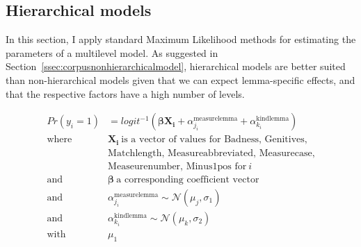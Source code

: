 \documentclass[USenglish]{article}
\begin{document}
\subsection{Hierarchical models}
\label{ssec:corpushierarchicalmodel}

In this section, I apply standard Maximum Likelihood methods for estimating the parameters of a multilevel model.
As suggested in Section~\ref{ssec:corpusnonhierarchicalmodel}, hierarchical models are better suited than non-hierarchical models given that we can expect lemma-specific effects, and that the respective factors have a high number of levels.



\begin{equation}
  \begin{split}
    Pr(y_i=1)       & = logit^{-1}(\pmb{\beta}\mathbf{X_i} + \alpha^{\text{measurelemma}}_{j_i} + \alpha^{\text{kindlemma}}_{k_i}) \\
    \text{where}\ \ & \mathbf{X_i}\ \text{is a vector of values for Badness, Genitives, } \\
                    & \text{Matchlength, Measureabbreviated, Measurecase,} \\
                    & \text{Measeurenumber, Minus1pos for}\ i \\
    \text{and}\ \   & \pmb{\beta}\ \text{a corresponding coefficient vector} \\
    \text{and}\ \   & \alpha^{\text{measurelemma}}_{j_i}\sim\mathcal{N}(\mu_j,\sigma_1) \\
    \text{and}\ \   & \alpha^{\text{kindlemma}}_{k_i}\sim\mathcal{N}(\mu_k,\sigma_2) \\
    \text{with}\ \  & \mu_1 \\
  \end{split}
  \label{eq:model:mnglmm}
\end{equation}
\end{document}
